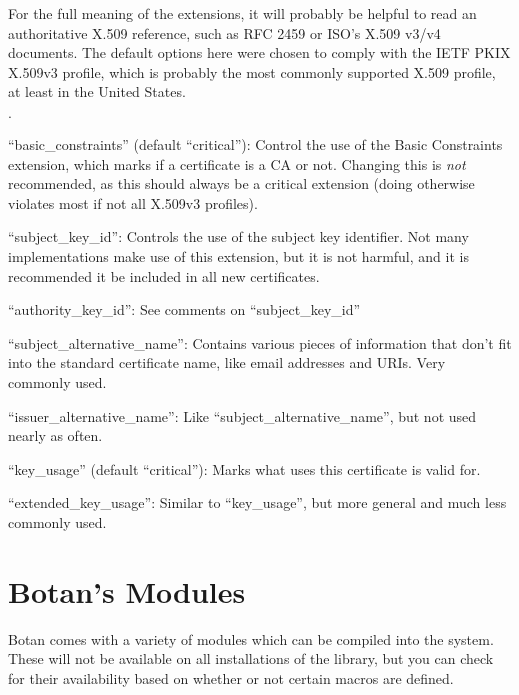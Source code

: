 \documentclass{article}
\begin{document}
For the full meaning of the extensions, it will probably be helpful to read an
authoritative X.509 reference, such as RFC 2459 or ISO's X.509 v3/v4 documents.
The default options here were chosen to comply with the IETF PKIX X.509v3
profile, which is probably the most commonly supported X.509 profile, at least
in the United States.

\begin{list}{$\cdot$}
   \item ``basic\_constraints'' (default ``critical''): Control the use of the
         Basic Constraints extension, which marks if a certificate is a CA or
         not. Changing this is \emph{not} recommended, as this should always
         be a critical extension (doing otherwise violates most if not all
         X.509v3 profiles).
   \item
   \item ``subject\_key\_id'': Controls the use of the subject key identifier.
         Not many implementations make use of this extension, but it is not
         harmful, and it is recommended it be included in all new certificates.

   \item ``authority\_key\_id'': See comments on ``subject\_key\_id''

   \item ``subject\_alternative\_name'': Contains various pieces of information
         that don't fit into the standard certificate name, like email
         addresses and URIs. Very commonly used.

   \item ``issuer\_alternative\_name'': Like ``subject\_alternative\_name'',
         but not used nearly as often.

   \item ``key\_usage'' (default ``critical''): Marks what uses this
         certificate is valid for.

   \item ``extended\_key\_usage'': Similar to ``key\_usage'', but more general
         and much less commonly used.
\end{list}

\pagebreak
\section{Botan's Modules}

Botan comes with a variety of modules which can be compiled into the system.
These will not be available on all installations of the library, but you can
check for their availability based on whether or not certain macros are
defined.
\end{document}
